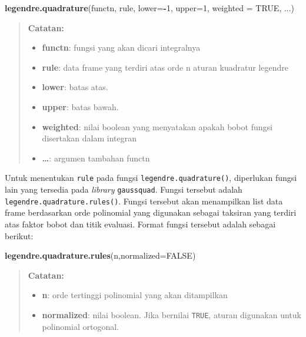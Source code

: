 \documentclass[]{book}
\newenvironment{Shaded}{\begin{snugshade}}{\end{snugshade}}
\newcommand{\DataTypeTok}[1]{\textcolor[rgb]{0.13,0.29,0.53}{#1}}
\newcommand{\DecValTok}[1]{\textcolor[rgb]{0.00,0.00,0.81}{#1}}
\newcommand{\KeywordTok}[1]{\textcolor[rgb]{0.13,0.29,0.53}{\textbf{#1}}}
\newcommand{\NormalTok}[1]{#1}
\newcommand{\OperatorTok}[1]{\textcolor[rgb]{0.81,0.36,0.00}{\textbf{#1}}}
\newcommand{\OtherTok}[1]{\textcolor[rgb]{0.56,0.35,0.01}{#1}}
\providecommand{\tightlist}{%
  \setlength{\itemsep}{0pt}\setlength{\parskip}{0pt}}
\theoremstyle{definition}
\theoremstyle{definition}
\theoremstyle{definition}
\theoremstyle{remark}
\begin{document}
\begin{Shaded}
\begin{Highlighting}[]
\KeywordTok{legendre.quadrature}\NormalTok{(functn, rule, }\DataTypeTok{lower=}\OperatorTok{-}\DecValTok{1}\NormalTok{, }\DataTypeTok{upper=}\DecValTok{1}\NormalTok{, }
  \DataTypeTok{weighted =} \OtherTok{TRUE}\NormalTok{, ...)}
\end{Highlighting}
\end{Shaded}

\begin{quote}
\textbf{Catatan:}

\begin{itemize}
\tightlist
\item
  \textbf{functn}: fungsi yang akan dicari integralnya
\item
  \textbf{rule}: data frame yang terdiri atas orde n aturan kuadratur legendre
\item
  \textbf{lower}: batas atas.
\item
  \textbf{upper}: batas bawah.
\item
  \textbf{weighted}: nilai boolean yang menyatakan apakah bobot fungsi disertakan dalam integran
\item
  \textbf{\ldots{}}: argumen tambahan functn
\end{itemize}
\end{quote}

Untuk menentukan \texttt{rule} pada fungsi \texttt{legendre.quadrature()}, diperlukan fungsi lain yang tersedia pada \emph{library} \texttt{gaussquad}. Fungsi tersebut adalah \texttt{legendre.quadrature.rules()}. Fungsi tersebut akan menampilkan list data frame berdasarkan orde polinomial yang digunakan sebagai taksiran yang terdiri atas faktor bobot dan titik evaluasi. Format fungsi tersebut adalah sebagai berikut:

\begin{Shaded}
\begin{Highlighting}[]
\KeywordTok{legendre.quadrature.rules}\NormalTok{(n,}\DataTypeTok{normalized=}\OtherTok{FALSE}\NormalTok{)}
\end{Highlighting}
\end{Shaded}

\begin{quote}
\textbf{Catatan:}

\begin{itemize}
\tightlist
\item
  \textbf{n}: orde tertinggi polinomial yang akan ditampilkan
\item
  \textbf{normalized}: nilai boolean. Jika bernilai \texttt{TRUE}, aturan digunakan untuk polinomial ortogonal.
\end{itemize}
\end{quote}
\end{document}
